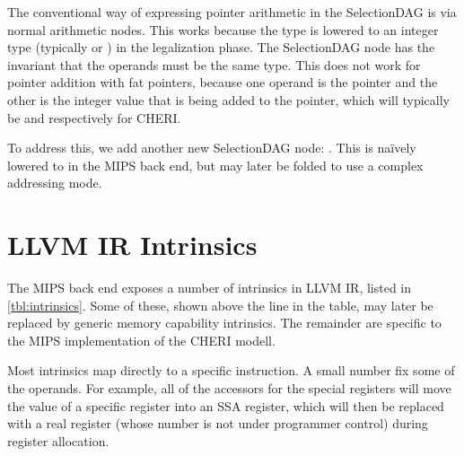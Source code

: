 The conventional way of expressing pointer arithmetic in the SelectionDAG is via normal arithmetic nodes.
This works because the  type is lowered to an integer type (typically  or ) in the legalization phase.
The  SelectionDAG node has the invariant that the operands must be the same type.
This does not work for pointer addition with fat pointers, because one operand is the pointer and the other is the integer value that is being added to the pointer, which will typically be  and  respectively for CHERI.

To address this, we add another new SelectionDAG node: .
This is naïvely lowered to  in the MIPS back end, but may later be folded to use a complex addressing mode.

\section{LLVM IR Intrinsics}

The MIPS back end exposes a number of intrinsics in LLVM IR, listed in \autoref{tbl:intrinsics}.
Some of these, shown above the line in the table, may later be replaced by generic memory capability intrinsics.
The remainder are specific to the MIPS implementation of the CHERI modell.

Most intrinsics map directly to a specific instruction.
A small number fix some of the operands.
For example, all of the accessors for the special registers will move the value of a specific register into an SSA register, which will then be replaced with a real register (whose number is not under programmer control) during register allocation.

